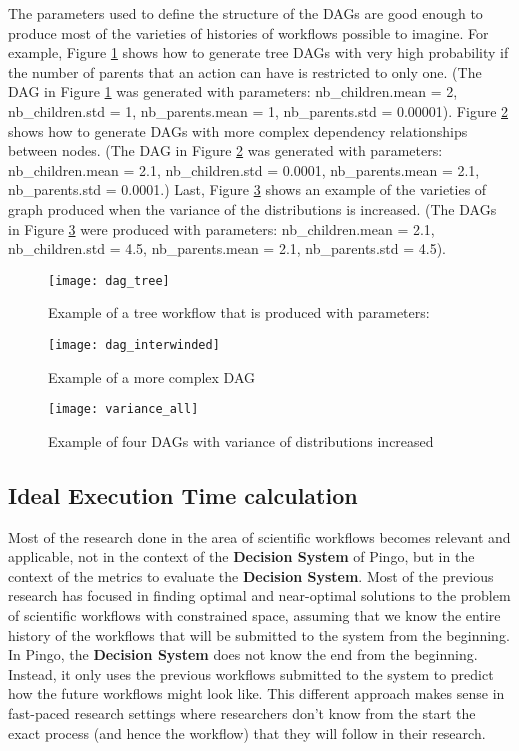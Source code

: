 The parameters used to define the structure of the DAGs are good enough to produce most of the varieties of histories of workflows possible to imagine.  For example, Figure \ref{fig:dag_tree} shows how to generate tree DAGs with very high probability if the number of parents that an action can have is restricted to only one.  (The DAG in Figure \ref{fig:dag_tree} was generated with parameters:
nb\_children.mean = 2, nb\_children.std =  1, nb\_parents.mean = 1, nb\_parents.std = 0.00001). Figure \ref{fig:dag_complex} shows how to generate DAGs with more complex dependency relationships between nodes.  (The DAG in Figure \ref{fig:dag_complex} was generated with parameters:  nb\_children.mean = 2.1, nb\_children.std = 0.0001, nb\_parents.mean = 2.1, nb\_parents.std = 0.0001.) Last, Figure \ref{fig:dag_variety} shows an example of the varieties of graph produced when the variance of the distributions is increased.  (The DAGs in Figure \ref{fig:dag_variety} were produced with parameters: nb\_children.mean = 2.1, nb\_children.std = 4.5, nb\_parents.mean = 2.1, nb\_parents.std = 4.5).
\begin{figure}
\centering
\texttt{[image: dag\_tree]}
\caption{Example of a tree workflow that is produced with parameters: }
\label{fig:dag_tree}
\end{figure}
\begin{figure}
\centering
\texttt{[image: dag\_interwinded]}
\caption{Example of a more complex DAG}
\label{fig:dag_complex}
\end{figure}

\begin{figure}
\centering
\texttt{[image: variance\_all]}
\caption{Example of four DAGs with variance of distributions increased}
\label{fig:dag_variety}
\end{figure}


\subsection{Ideal Execution Time calculation}
Most of the research done in the area of scientific workflows becomes relevant and applicable, not in the context of the \textbf{Decision System} of Pingo, but in the context of the metrics to evaluate the \textbf{Decision System}.  Most of the previous research has focused in finding optimal and near-optimal solutions to the problem of scientific workflows with constrained space, assuming that we know the entire history of the workflows that will be submitted to the system from the beginning.  In Pingo, the \textbf{Decision System} does not know the end from the beginning.  Instead, it only uses the previous workflows submitted to the system to predict how the future workflows might look like.  This different approach makes sense in fast-paced research settings where researchers don't know from the start the exact process (and hence the workflow) that they will follow in their research.

